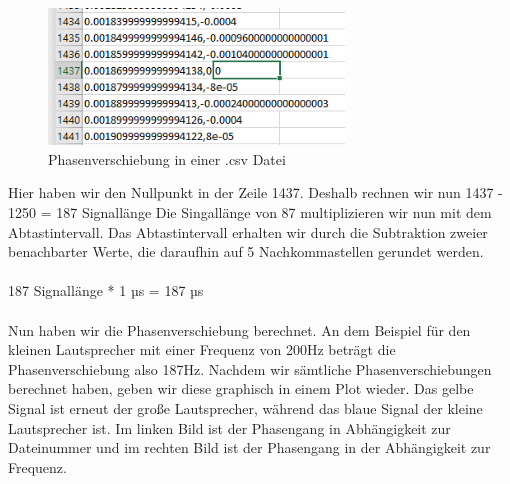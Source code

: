 \documentclass[12pt, oneside, a4paper, \docLanguage]{report}
\begin{document}
\begin{figure}[H]
	\centering\small
	\includegraphics[width=0.7\textwidth]{media/excel.png}
	\caption{Phasenverschiebung in einer .csv Datei}
	\label{img:Phasenverschiebung in einer .csv Datei}
\end{figure}
\newpage
Hier haben wir den Nullpunkt in der Zeile 1437. Deshalb rechnen wir nun 1437 - 1250 = 187 Signallänge
Die Singallänge von 87 multiplizieren wir nun mit dem Abtastintervall. Das Abtastintervall erhalten wir durch die Subtraktion zweier benachbarter Werte, die daraufhin auf 5 Nachkommastellen gerundet werden.
\\~\\
187 Signallänge *  1 µs  = 187 µs 
\\~\\
Nun haben wir die Phasenverschiebung berechnet. An dem Beispiel für den kleinen Lautsprecher mit einer Frequenz von 200Hz beträgt die Phasenverschiebung also 187Hz.
Nachdem wir sämtliche Phasenverschiebungen berechnet haben, geben wir diese graphisch in einem Plot wieder.
Das gelbe Signal ist erneut der große Lautsprecher, während das blaue Signal der kleine Lautsprecher ist.
Im linken Bild ist der Phasengang in Abhängigkeit zur Dateinummer und im rechten Bild ist der Phasengang in der Abhängigkeit zur Frequenz.
\end{document}
